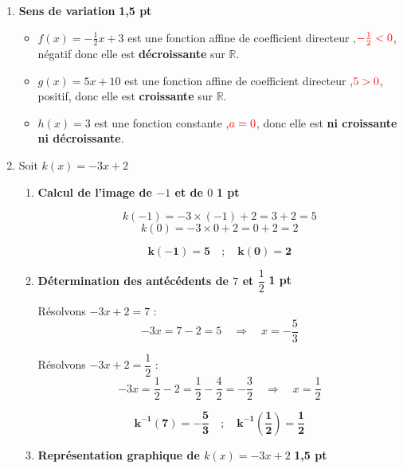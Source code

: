 \documentclass[12pt,a4paper]{article}
\begin{document}
\begin{enumerate}
    \item \textbf{Sens de variation} \hfill \textbf{1,5 pt}
    
    \begin{itemize}
        \item \( f(x) = -\frac{1}{2}x + 3 \) est une fonction affine de coefficient directeur ,$\textcolor{red}{-\frac{1}{2}<0}$, négatif  donc elle est \textbf{décroissante} sur \( \mathbb{R} \).
        \item \( g(x) = 5x + 10 \) est une fonction affine de coefficient directeur ,$\textcolor{red}{5>0}$, positif, donc elle est \textbf{croissante} sur \( \mathbb{R} \).
        \item \( h(x) = 3 \) est une fonction constante ,$\textcolor{red}{a=0}$, donc elle est \textbf{ni croissante ni décroissante}.
    \end{itemize}

    \item Soit \( k(x) = -3x + 2 \)
    \begin{enumerate}
        \item \textbf{Calcul de l’image de \(-1\) et de \(0\)} \hfill \textbf{1 pt}
        
        \[
        k(-1) = -3 \times (-1) + 2 = 3 + 2 = 5
        \]
        \[
        k(0) = -3 \times 0 + 2 = 0 + 2 = 2
        \]
        
     \begin{resultbox}
    \[
    \mathbf{k(-1) = 5 \quad ; \quad k(0) = 2}
    \]
		\end{resultbox}

        \item \textbf{Détermination des antécédents de \( 7 \) et \( \dfrac{1}{2} \)} \hfill \textbf{1 pt}

        Résolvons \( -3x + 2 = 7 \) :
        \[
        -3x = 7 - 2 = 5 \quad \Rightarrow \quad x = -\frac{5}{3}
        \]

        Résolvons \( -3x + 2 = \dfrac{1}{2} \) :
        \[
        -3x = \frac{1}{2} - 2 = \frac{1}{2} - \frac{4}{2} = -\frac{3}{2} \quad \Rightarrow \quad x = \frac{1}{2}
        \]

		\begin{resultbox}
    \[
    \mathbf{k^{-1}(7) = -\frac{5}{3} \quad ; \quad k^{-1}\left(\frac{1}{2}\right) = \frac{1}{2}}
    \]
		\end{resultbox}

        \item \textbf{Représentation graphique de \( k(x) = -3x + 2 \)} \hfill \textbf{1,5 pt}


\end{enumerate}
\end{enumerate}
\end{document}
